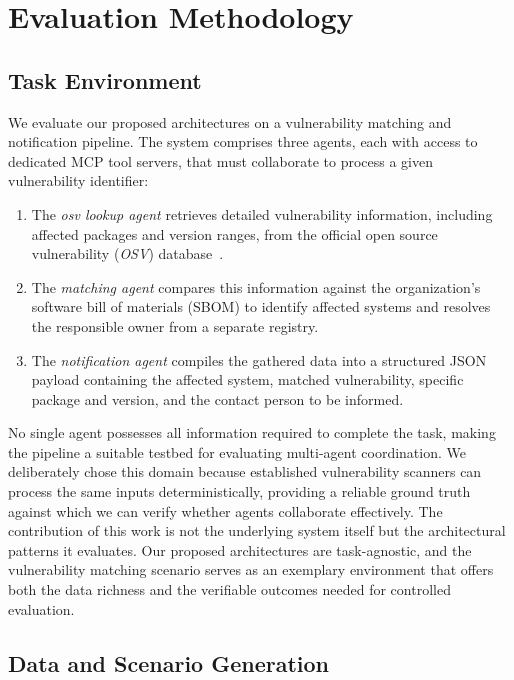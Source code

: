 \section{Evaluation Methodology}

\subsection{Task Environment}
We evaluate our proposed architectures on a vulnerability matching and notification pipeline. The system comprises three agents, each with access to dedicated MCP tool servers, that must collaborate to process a given vulnerability identifier:
\begin{enumerate}
    \item The \emph{osv lookup agent} retrieves detailed vulnerability information, including affected packages and version ranges, from the official open source vulnerability (\emph{OSV}) database~\cite{osv_api}.
    \item The \emph{matching agent} compares this information against the organization's software bill of materials (SBOM) to identify affected systems and resolves the responsible owner from a separate registry.
    \item The \emph{notification agent} compiles the gathered data into a structured JSON payload containing the affected system, matched vulnerability, specific package and version, and the contact person to be informed.
\end{enumerate}

No single agent possesses all information required to complete the task, making the pipeline a suitable testbed for evaluating multi-agent coordination. We deliberately chose this domain because established vulnerability scanners can process the same inputs deterministically, providing a reliable ground truth against which we can verify whether agents collaborate effectively. The contribution of this work is not the underlying system itself but the architectural patterns it evaluates. Our proposed architectures are task-agnostic, and the vulnerability matching scenario serves as an exemplary environment that offers both the data richness and the verifiable outcomes needed for controlled evaluation.

\subsection{Data and Scenario Generation}

